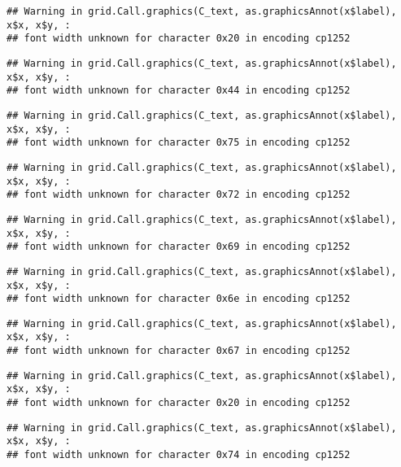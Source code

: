 \documentclass[
]{article}
\begin{document}
\begin{verbatim}
## Warning in grid.Call.graphics(C_text, as.graphicsAnnot(x$label), x$x, x$y, :
## font width unknown for character 0x20 in encoding cp1252
\end{verbatim}

\begin{verbatim}
## Warning in grid.Call.graphics(C_text, as.graphicsAnnot(x$label), x$x, x$y, :
## font width unknown for character 0x44 in encoding cp1252
\end{verbatim}

\begin{verbatim}
## Warning in grid.Call.graphics(C_text, as.graphicsAnnot(x$label), x$x, x$y, :
## font width unknown for character 0x75 in encoding cp1252
\end{verbatim}

\begin{verbatim}
## Warning in grid.Call.graphics(C_text, as.graphicsAnnot(x$label), x$x, x$y, :
## font width unknown for character 0x72 in encoding cp1252
\end{verbatim}

\begin{verbatim}
## Warning in grid.Call.graphics(C_text, as.graphicsAnnot(x$label), x$x, x$y, :
## font width unknown for character 0x69 in encoding cp1252
\end{verbatim}

\begin{verbatim}
## Warning in grid.Call.graphics(C_text, as.graphicsAnnot(x$label), x$x, x$y, :
## font width unknown for character 0x6e in encoding cp1252
\end{verbatim}

\begin{verbatim}
## Warning in grid.Call.graphics(C_text, as.graphicsAnnot(x$label), x$x, x$y, :
## font width unknown for character 0x67 in encoding cp1252
\end{verbatim}

\begin{verbatim}
## Warning in grid.Call.graphics(C_text, as.graphicsAnnot(x$label), x$x, x$y, :
## font width unknown for character 0x20 in encoding cp1252
\end{verbatim}

\begin{verbatim}
## Warning in grid.Call.graphics(C_text, as.graphicsAnnot(x$label), x$x, x$y, :
## font width unknown for character 0x74 in encoding cp1252
\end{verbatim}
\end{document}
